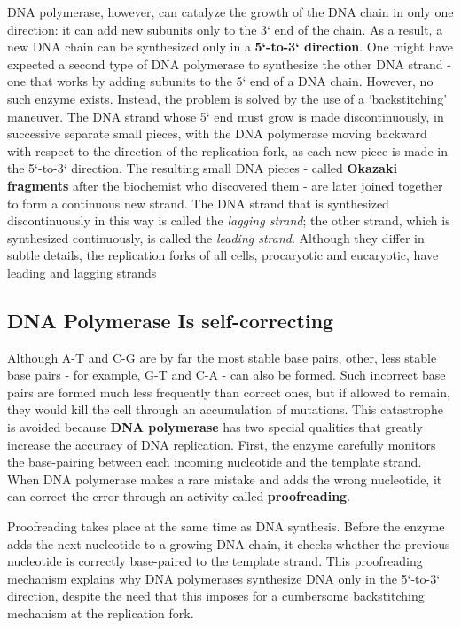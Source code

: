 DNA polymerase, however, can catalyze the growth of the DNA chain in
only one direction: it can add new subunits only to the 3` end of the chain.
As a result, a new DNA chain can be synthesized only
in a \textbf{5`-to-3` direction}. One
might have expected a second type of DNA polymerase to synthesize the
other DNA strand - one that works by adding subunits to the 5` end of
a DNA chain. However, no such enzyme exists. Instead, the problem is
solved by the use of a ‘backstitching’ maneuver. The DNA strand whose
5` end must grow is made discontinuously, in successive separate small
pieces, with the DNA polymerase moving backward with respect to the
direction of the replication fork, as each new piece is made in the 5`-to-3`
direction.
The resulting small DNA pieces - called \textbf{Okazaki fragments} after the
biochemist who discovered them - are later joined together to form a
continuous new strand. The DNA strand that is synthesized
discontinuously in this way is called the \textit{lagging strand}; the other strand,
which is synthesized continuously, is called the \textit{leading strand}.
Although they differ in subtle details, the replication forks of all cells,
procaryotic and eucaryotic, have leading and lagging strands

\subsection{DNA Polymerase Is self-correcting}

Although A-T and C-G are by far the most stable base pairs, other, less
stable base pairs - for example, G-T and C-A - can also be formed. Such
incorrect base pairs are formed much less frequently than correct ones,
but if allowed to remain, they would kill the cell through an accumulation
of mutations. This catastrophe is avoided because \textbf{DNA polymerase}
has two special qualities that greatly increase the accuracy of DNA replication.
First, the enzyme carefully monitors the base-pairing between
each incoming nucleotide and the template strand.
When DNA polymerase makes a rare mistake and adds
the wrong nucleotide, it can correct the error through an activity called
\textbf{proofreading}.

Proofreading takes place at the same time as DNA synthesis. Before
the enzyme adds the next nucleotide to a growing DNA chain, it checks
whether the previous nucleotide is correctly base-paired to the template
strand. This proofreading mechanism explains why DNA polymerases synthesize
DNA only in the 5`-to-3` direction, despite the need that this imposes for a
cumbersome backstitching mechanism at the replication fork.


